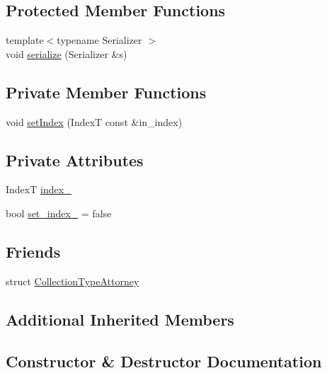 \subsection*{Protected Member Functions}
\begin{DoxyCompactItemize}
\item 
{\footnotesize template$<$typename Serializer $>$ }\\void \hyperlink{structvt_1_1vrt_1_1collection_1_1_indexable_a6c95be93183665a0d03c149207f000f9}{serialize} (Serializer \&s)
\end{DoxyCompactItemize}
\subsection*{Private Member Functions}
\begin{DoxyCompactItemize}
\item 
void \hyperlink{structvt_1_1vrt_1_1collection_1_1_indexable_ac874c5ebba6b238f8f57018c01a3c67c}{set\+Index} (IndexT const \&in\+\_\+index)
\end{DoxyCompactItemize}
\subsection*{Private Attributes}
\begin{DoxyCompactItemize}
\item 
IndexT \hyperlink{structvt_1_1vrt_1_1collection_1_1_indexable_aa238a04594333c44308be2a063b3b70a}{index\+\_\+}
\item 
bool \hyperlink{structvt_1_1vrt_1_1collection_1_1_indexable_a946600975ab9eb4d1b122b6267bea35e}{set\+\_\+index\+\_\+} = false
\end{DoxyCompactItemize}
\subsection*{Friends}
\begin{DoxyCompactItemize}
\item 
struct \hyperlink{structvt_1_1vrt_1_1collection_1_1_indexable_abb4eb03ec2c75b459ceec69021d22a2b}{Collection\+Type\+Attorney}
\end{DoxyCompactItemize}
\subsection*{Additional Inherited Members}


\subsection{Constructor \& Destructor Documentation}
\mbox{\label{structvt_1_1vrt_1_1collection_1_1_indexable_ad3f327a35771a31ec63241b9be57569c}} 
